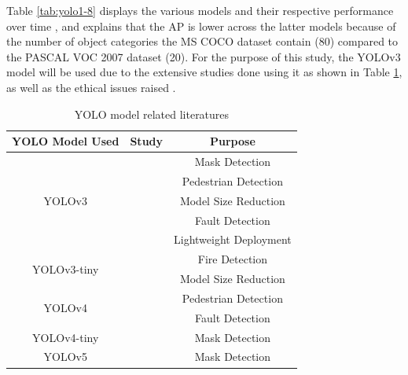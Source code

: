 Table \ref{tab:yolo1-8} displays the various models and their respective performance over time  \cite{tervenComprehensiveReviewYOLO2023}, and explains that the AP is lower across the latter models because of the number of object categories the MS COCO dataset contain (80) compared to the PASCAL VOC 2007 dataset (20). For the purpose of this study, the YOLOv3 model will be used due to the extensive studies done using it as shown in Table \ref{tab:yolo_studies}, as well as the ethical issues raised \cite{sagarYOLOCreatorQuits2020}.

\begin{table}[]
    \centering
    \caption{YOLO model related literatures}
    \resizebox{0.8\linewidth}{!}
    {
    \begin{tabular}{c c c}
        \hline
        YOLO Model Used & Study & Purpose  \\
        \hline
        \multirow{5}{*}{YOLOv3} &  \cite{liuApplicationYoloMask2021, sevillaMaskVisionMachineVisionBased2021} & Mask Detection \\\cline{2-3}
         & \cite{xuEfficientPedestrianDetection2022, rakhsithFaceMaskSocial2021, srinivasanCOVID19MonitoringSystem2021, gongPedestrianDetectionAlgorithm2022} & Pedestrian Detection \\\cline{2-3}
         & \cite{chakarDepthwiseSeparableConvolutions2020, ghoshDeepNetworkPruning2019} & Model Size Reduction \\\cline{2-3}
         & \cite{liYOLOv3LiteLightweightCrack2019} & Fault Detection \\\cline{2-3}
         & \cite{sunYoloBasedLightweightObject2023} & Lightweight Deployment \\
        \hline
        \multirow{2}{*}{YOLOv3-tiny} & \cite{liFireObjectDetection2022} & Fire Detection \\\cline{2-3}
        & \cite{qianEfficientModelCompression2018} & Model Size Reduction \\
        \hline
        \multirow{2}{*}{YOLOv4} & \cite{bhambaniRealtimeFaceMask2020} & Pedestrian Detection \\\cline{2-3}
        & \cite{sarmientoPavementDistressDetection2021} & Fault Detection \\
        \hline
        YOLOv4-tiny & \cite{sathyamurthyRealtimeFaceMask2021, liberatoriYOLOBasedFaceMask2022} & Mask Detection \\
        \hline
        YOLOv5 & \cite{youssryAccurateRealTimeFace2022} & Mask Detection \\
        \hline
    \end{tabular}
    }
    \label{tab:yolo_studies}
\end{table}
